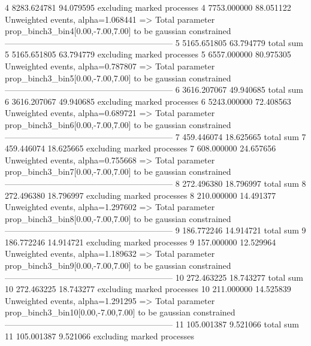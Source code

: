 4          8283.624781     94.079595       excluding marked processes    
4          7753.000000     88.051122       Unweighted events, alpha=1.068441
  => Total parameter prop_binch3_bin4[0.00,-7.00,7.00] to be gaussian constrained
------------------------------------------------------------
5          5165.651805     63.794779       total sum                     
5          5165.651805     63.794779       excluding marked processes    
5          6557.000000     80.975305       Unweighted events, alpha=0.787807
  => Total parameter prop_binch3_bin5[0.00,-7.00,7.00] to be gaussian constrained
------------------------------------------------------------
6          3616.207067     49.940685       total sum                     
6          3616.207067     49.940685       excluding marked processes    
6          5243.000000     72.408563       Unweighted events, alpha=0.689721
  => Total parameter prop_binch3_bin6[0.00,-7.00,7.00] to be gaussian constrained
------------------------------------------------------------
7          459.446074      18.625665       total sum                     
7          459.446074      18.625665       excluding marked processes    
7          608.000000      24.657656       Unweighted events, alpha=0.755668
  => Total parameter prop_binch3_bin7[0.00,-7.00,7.00] to be gaussian constrained
------------------------------------------------------------
8          272.496380      18.796997       total sum                     
8          272.496380      18.796997       excluding marked processes    
8          210.000000      14.491377       Unweighted events, alpha=1.297602
  => Total parameter prop_binch3_bin8[0.00,-7.00,7.00] to be gaussian constrained
------------------------------------------------------------
9          186.772246      14.914721       total sum                     
9          186.772246      14.914721       excluding marked processes    
9          157.000000      12.529964       Unweighted events, alpha=1.189632
  => Total parameter prop_binch3_bin9[0.00,-7.00,7.00] to be gaussian constrained
------------------------------------------------------------
10         272.463225      18.743277       total sum                     
10         272.463225      18.743277       excluding marked processes    
10         211.000000      14.525839       Unweighted events, alpha=1.291295
  => Total parameter prop_binch3_bin10[0.00,-7.00,7.00] to be gaussian constrained
------------------------------------------------------------
11         105.001387      9.521066        total sum                     
11         105.001387      9.521066        excluding marked processes    
